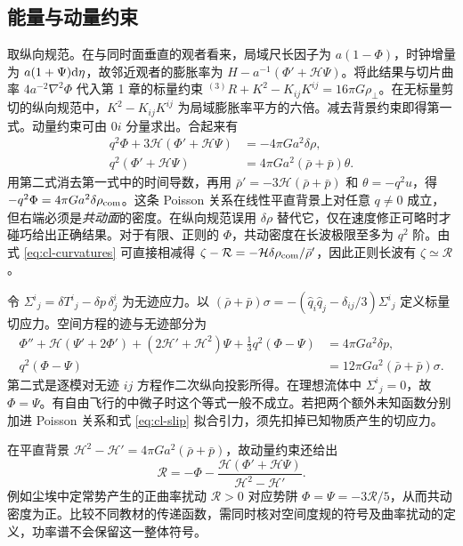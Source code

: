 \subsection{能量与动量约束}

取纵向规范。在与同时面垂直的观者看来，局域尺长因子为 $a(1-\Phi)$，时钟增量为 $a(1+\Psi)\dd\eta$，故邻近观者的膨胀率为 $H-a^{-1}(\Phi'+\mathcal H\Psi)$。将此结果与切片曲率 $4a^{-2}\nabla^2\Phi$ 代入第 1 章的标量约束 ${}^{(3)}R+K^2-K_{ij}K^{ij}=16\pi G\rho_{\perp}$。在无标量剪切的纵向规范中，$K^2-K_{ij}K^{ij}$ 为局域膨胀率平方的六倍。减去背景约束即得第一式。动量约束可由 $0i$ 分量求出。合起来有
\begin{align}
 q^2\Phi+3\mathcal H(\Phi'+\mathcal H\Psi)
       &=-4\pi G a^2\delta\rho,\label{eq:cl-ham}\\
 q^2(\Phi'+\mathcal H\Psi)
       &=4\pi G a^2(\bar\rho+\bar p)\theta .\label{eq:cl-mom}
\end{align}
用第二式消去第一式中的时间导数，再用 $\bar\rho'=-3\mathcal H(\bar\rho+\bar p)$ 和 $\theta=-q^2u$，得 $-q^2\Phi=4\pi G a^2\delta\rho_{\rm com}$。这条 Poisson 关系在线性平直背景上对任意 $q\ne0$ 成立，但右端必须是\emph{共动面}的密度。在纵向规范误用 $\delta\rho$ 替代它，仅在速度修正可略时才碰巧给出正确结果。对于有限、正则的 $\Phi$，共动密度在长波极限至多为 $q^2$ 阶。由式 \eqref{eq:cl-curvatures} 可直接相减得 $\zeta-\mathcal R=-\mathcal H\delta\rho_{\rm com}/\bar\rho'$，因此正则长波有 $\zeta\simeq\mathcal R$。

令 $\Sigma^i{}_j=\delta T^i{}_j-\delta p\,\delta^i_j$ 为无迹应力。以 $(\bar\rho+\bar p)\sigma=-(\hat q_i\hat q_j-\delta_{ij}/3)\Sigma^i{}_j$ 定义标量切应力。空间方程的迹与无迹部分为
\begin{align}
 \Phi''+\mathcal H(\Psi'+2\Phi')+(2\mathcal H'+\mathcal H^2)\Psi
       +\tfrac13q^2(\Phi-\Psi)&=4\pi G a^2\delta p, \label{eq:cl-trace}\\
 q^2(\Phi-\Psi)&=12\pi G a^2(\bar\rho+\bar p)\sigma .\label{eq:cl-slip}
\end{align}
第二式是逐模对无迹 $ij$ 方程作二次纵向投影所得。在理想流体中 $\Sigma^i{}_j=0$，故 $\Phi=\Psi$。有自由飞行的中微子时这个等式一般不成立。若把两个额外未知函数分别加进 Poisson 关系和式 \eqref{eq:cl-slip} 拟合引力，须先扣掉已知物质产生的切应力。

在平直背景 $\mathcal H^2-\mathcal H'=4\pi G a^2(\bar\rho+\bar p)$，故动量约束还给出
\begin{equation}\label{eq:cl-Rfromphi}
 \mathcal R=-\Phi-\frac{\mathcal H(\Phi'+\mathcal H\Psi)}
                                      {\mathcal H^2-\mathcal H'} .
\end{equation}
例如尘埃中定常势产生的正曲率扰动 $\mathcal R>0$ 对应势阱 $\Phi=\Psi=-3\mathcal R/5$，从而共动密度为正。比较不同教材的传递函数，需同时核对空间度规的符号及曲率扰动的定义，功率谱不会保留这一整体符号。

